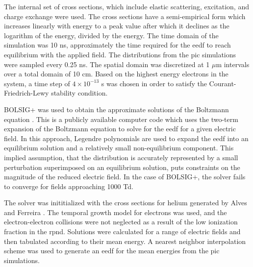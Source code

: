The internal set of cross sections, which include elastic scattering,
excitation, and charge exchange were used. The cross sections have a
semi-empirical form which increases linearly with energy to a peak value after
which it declines as the logarithm of the energy, divided by the energy. The
time domain of the simulation was 10 ns, approximately the time required for the
\acs{eedf} to reach equilibrium with the applied field. The distributions from
the \acs{pic} simulations were sampled every 0.25 ns. The spatial domain was
discretized at 1 $\mu$m intervals over a total domain of 10 cm. Based on the
highest energy electrons in the system, a time step of $4\times10^{-13}$ s was
chosen in order to satisfy the Courant-Friedrich-Lewy stability condition.

BOLSIG+ was used to obtain the approximate solutions of the Boltzmann equation
\cite{Hagelaar2005}. This is a publicly available computer code which uses the
two-term expansion of the Boltzmann equation to solve for the \acs{eedf} for a
given electric field. In this approach, Legendre polynomials are used to expand
the \acs{eedf} into an equilibrium solution and a relatively small
non-equilibrium component. This implied assumption, that the distribution is
accurately represented by a small perturbation superimposed on an equilibrium
solution, puts constraints on the magnitude of the reduced electric field. In
the case of BOLSIG+, the solver fails to converge for fields approaching 1000
Td.

The solver was inititialized with the cross sections for helium generated by
Alves and Ferreira \cite{Alves2013}. The temporal growth model for electrons was
used, and the electron-electron collisions were not neglected as a result of the
low ionization fraction in the \acs{rpnd}. Solutions were calculated for a range
of electric fields and then tabulated according to their mean energy. A nearest
neighbor interpolation scheme was used to generate an \acs{eedf} for the mean
energies from the \acs{pic} simulations.

